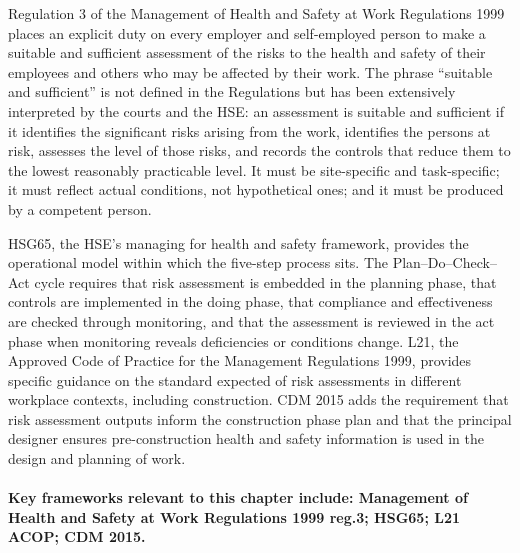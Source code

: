 Regulation 3 of the Management of Health and Safety at Work Regulations 1999 places an explicit duty on every employer and self-employed person to make a suitable and sufficient assessment of the risks to the health and safety of their employees and others who may be affected by their work. The phrase ``suitable and sufficient'' is not defined in the Regulations but has been extensively interpreted by the courts and the HSE: an assessment is suitable and sufficient if it identifies the significant risks arising from the work, identifies the persons at risk, assesses the level of those risks, and records the controls that reduce them to the lowest reasonably practicable level. It must be site-specific and task-specific; it must reflect actual conditions, not hypothetical ones; and it must be produced by a competent person.

HSG65, the HSE's managing for health and safety framework, provides the operational model within which the five-step process sits. The Plan--Do--Check--Act cycle requires that risk assessment is embedded in the planning phase, that controls are implemented in the doing phase, that compliance and effectiveness are checked through monitoring, and that the assessment is reviewed in the act phase when monitoring reveals deficiencies or conditions change. L21, the Approved Code of Practice for the Management Regulations 1999, provides specific guidance on the standard expected of risk assessments in different workplace contexts, including construction. CDM 2015 adds the requirement that risk assessment outputs inform the construction phase plan and that the principal designer ensures pre-construction health and safety information is used in the design and planning of work.

\paragraph{Key frameworks relevant to this chapter include: Management of Health and Safety at Work Regulations 1999 reg.3; HSG65; L21 ACOP; CDM 2015.}

